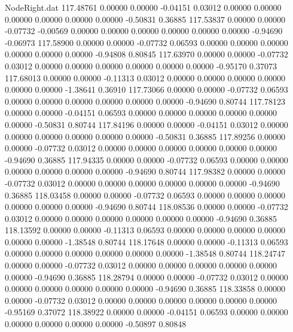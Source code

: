 \begin{filecontents}{NodeRight.dat}
 117.48761    0.00000    0.00000    -0.04151    0.03012    0.00000    0.00000    0.00000    0.00000    0.00000    0.00000   -0.50831    0.36885
 117.53837    0.00000    0.00000    -0.07732   -0.00569    0.00000    0.00000    0.00000    0.00000    0.00000    0.00000   -0.94690   -0.06973
 117.58900    0.00000    0.00000    -0.07732    0.06593    0.00000    0.00000    0.00000    0.00000    0.00000    0.00000   -0.94808    0.80845
 117.63970    0.00000    0.00000    -0.07732    0.03012    0.00000    0.00000    0.00000    0.00000    0.00000    0.00000   -0.95170    0.37073
 117.68013    0.00000    0.00000    -0.11313    0.03012    0.00000    0.00000    0.00000    0.00000    0.00000    0.00000   -1.38641    0.36910
 117.73066    0.00000    0.00000    -0.07732    0.06593    0.00000    0.00000    0.00000    0.00000    0.00000    0.00000   -0.94690    0.80744
 117.78123    0.00000    0.00000    -0.04151    0.06593    0.00000    0.00000    0.00000    0.00000    0.00000    0.00000   -0.50831    0.80744
 117.84196    0.00000    0.00000    -0.04151    0.03012    0.00000    0.00000    0.00000    0.00000    0.00000    0.00000   -0.50831    0.36885
 117.89256    0.00000    0.00000    -0.07732    0.03012    0.00000    0.00000    0.00000    0.00000    0.00000    0.00000   -0.94690    0.36885
 117.94335    0.00000    0.00000    -0.07732    0.06593    0.00000    0.00000    0.00000    0.00000    0.00000    0.00000   -0.94690    0.80744
 117.98382    0.00000    0.00000    -0.07732    0.03012    0.00000    0.00000    0.00000    0.00000    0.00000    0.00000   -0.94690    0.36885
 118.03458    0.00000    0.00000    -0.07732    0.06593    0.00000    0.00000    0.00000    0.00000    0.00000    0.00000   -0.94690    0.80744
 118.08536    0.00000    0.00000    -0.07732    0.03012    0.00000    0.00000    0.00000    0.00000    0.00000    0.00000   -0.94690    0.36885
 118.13592    0.00000    0.00000    -0.11313    0.06593    0.00000    0.00000    0.00000    0.00000    0.00000    0.00000   -1.38548    0.80744
 118.17648    0.00000    0.00000    -0.11313    0.06593    0.00000    0.00000    0.00000    0.00000    0.00000    0.00000   -1.38548    0.80744
 118.24747    0.00000    0.00000    -0.07732    0.03012    0.00000    0.00000    0.00000    0.00000    0.00000    0.00000   -0.94690    0.36885
 118.28794    0.00000    0.00000    -0.07732    0.03012    0.00000    0.00000    0.00000    0.00000    0.00000    0.00000   -0.94690    0.36885
 118.33858    0.00000    0.00000    -0.07732    0.03012    0.00000    0.00000    0.00000    0.00000    0.00000    0.00000   -0.95169    0.37072
 118.38922    0.00000    0.00000    -0.04151    0.06593    0.00000    0.00000    0.00000    0.00000    0.00000    0.00000   -0.50897    0.80848

\end{filecontents}
